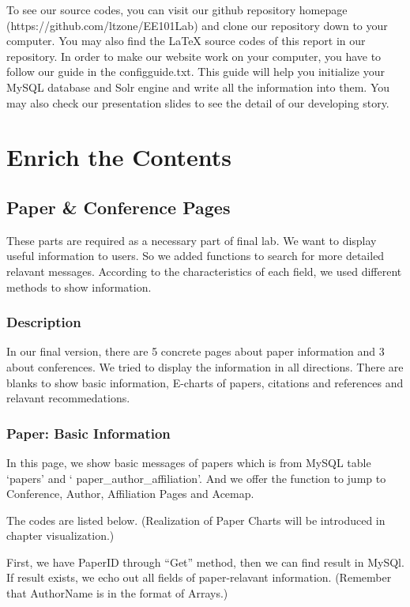 \documentclass{book}
\begin{document}
To see our source codes, you can visit our github repository homepage (https://github.com/ltzone/EE101Lab) and clone our repository down to your computer. You may also find the LaTeX source codes of this report in our repository. In order to make our website work on your computer, you have to follow our guide in the configguide.txt. This guide will help you initialize your MySQL database and Solr engine and write all the information into them. You may also check our presentation slides to see the detail of our developing story.


\mainmatter
\chapter {Enrich the Contents}

\section {Paper \& Conference Pages}

These parts are required as a necessary part of final lab. We want to display useful information to users. So we added functions to search for more detailed relavant messages. According to the characteristics of each field, we used different methods to show information.


\subsection{Description}
In our final version, there are 5 concrete pages about paper information and 3 about conferences. We tried to display the information in all directions. There are blanks to show basic information, E-charts of papers, citations and references and relavant recommedations. 

\subsection{Paper: Basic Information}
In this page, we show basic messages of papers
which is from MySQL table `papers' and ` paper\_author\_affiliation'.
 And we offer the function to jump to Conference, Author, Affiliation Pages and Acemap.


The codes are listed below. (Realization of Paper Charts will be introduced in chapter visualization.)

First, we have PaperID through ``Get'' method, then we can find result in MySQl. If result exists, we echo out all fields of paper-relavant  information. (Remember that  AuthorName is in the format of Arrays.)
\end{document}
